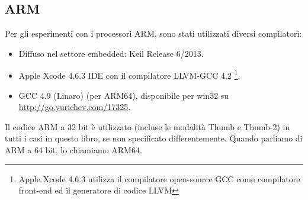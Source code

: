 \subsection{ARM}
\label{sec:hw_ARM}

\myindex{\idevices}
Per gli esperimenti con i processori ARM, sono stati utilizzati diversi compilatori:

\begin{itemize}
\item Diffuso nel settore embedded: Keil Release 6/2013.

\item Apple Xcode 4.6.3 IDE con il compilatore LLVM-GCC 4.2
\footnote{Apple Xcode 4.6.3 utilizza il compilatore open-source GCC come compilatore front-end ed il generatore di codice LLVM}.

\item GCC 4.9 (Linaro) (per ARM64), disponibile per win32 su \url{http://go.yurichev.com/17325}.

\end{itemize}

Il codice ARM a 32 bit è utilizzato (incluse le modalità Thumb e Thumb-2) in tutti i casi in questo libro, se non specificato differentemente.
Quando parliamo di ARM a 64 bit, lo chiamiamo ARM64.






